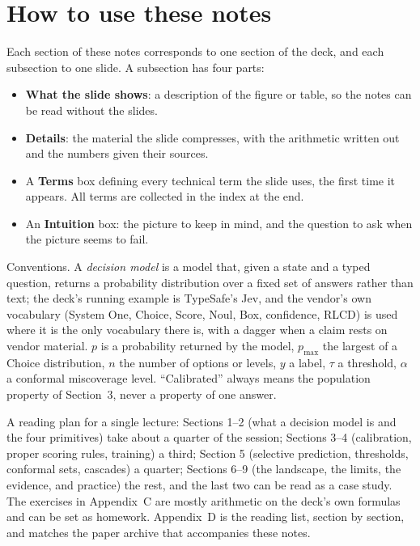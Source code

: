 \documentclass[11pt,letterpaper]{article}
\newcommand{\setstage}[1]{\colorlet{stagec}{#1}}
\newcommand{\pmax}{p_{\max}}
\begin{document}
\section*{How to use these notes}
Each section of these notes corresponds to one section of the deck, and each subsection to one slide. A subsection has four parts:
\begin{itemize}
  \item \textbf{What the slide shows}: a description of the figure or table, so the notes can be read without the slides.
  \item \textbf{Details}: the material the slide compresses, with the arithmetic written out and the numbers given their sources.
  \item A \textbf{Terms} box defining every technical term the slide uses, the first time it appears. All terms are collected in the index at the end.
  \item An \textbf{Intuition} box: the picture to keep in mind, and the question to ask when the picture seems to fail.
\end{itemize}
Conventions. A \emph{decision model} is a model that, given a state and a typed question, returns a probability distribution over a fixed set of answers rather than text; the deck's running example is TypeSafe's Jev, and the vendor's own vocabulary (System One, Choice, Score, Noul, Box, confidence, RLCD) is used where it is the only vocabulary there is, with a dagger when a claim rests on vendor material. $p$ is a probability returned by the model, $\pmax$ the largest of a Choice distribution, $n$ the number of options or levels, $y$ a label, $\tau$ a threshold, $\alpha$ a conformal miscoverage level. ``Calibrated'' always means the population property of Section~3, never a property of one answer.

A reading plan for a single lecture: Sections 1--2 (what a decision model is and the four primitives) take about a quarter of the session; Sections 3--4 (calibration, proper scoring rules, training) a third; Section 5 (selective prediction, thresholds, conformal sets, cascades) a quarter; Sections 6--9 (the landscape, the limits, the evidence, and practice) the rest, and the last two can be read as a case study. The exercises in Appendix~C are mostly arithmetic on the deck's own formulas and can be set as homework. Appendix~D is the reading list, section by section, and matches the paper archive that accompanies these notes.
\setstage{ink}
\end{document}
